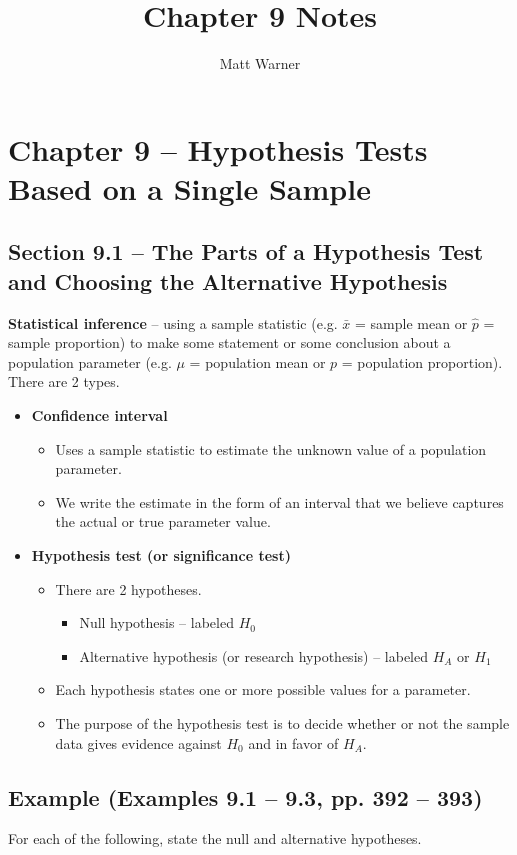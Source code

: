 \documentclass{report}
\title{\Huge{Chapter 9 Notes}}
\author{\huge{Matt Warner}}
\date{\huge{}}
\begin{document}
  \maketitle
\chapter*{Chapter 9 – Hypothesis Tests Based on a Single Sample}
\section*{Section 9.1 – The Parts of a Hypothesis Test and Choosing the Alternative Hypothesis}
\textbf{Statistical inference} – using a sample statistic (e.g. $\bar{x}$ = sample mean or $\hat{p}$ = sample proportion) to make some statement or some conclusion about a population parameter (e.g. $\mu$ = population mean or $p$ = population proportion). There are 2 types.
\begin{itemize}
  \item \textbf{Confidence interval}
    \begin{itemize}[label=$\circ$]
    \item Uses a sample statistic to estimate the unknown value of a population parameter.
    \item We write the estimate in the form of an interval that we believe captures the actual or true parameter value.
  \end{itemize}
  \item \textbf{Hypothesis test (or significance test)}
  \begin{itemize}
    \item There are 2 hypotheses.
    \begin{itemize}
      \item Null hypothesis – labeled $H_0$
      \item Alternative hypothesis (or research hypothesis) – labeled $H_A$ or $H_1$
    \end{itemize}
    \item Each hypothesis states one or more possible values for a parameter.
    \item The purpose of the hypothesis test is to decide whether or not the sample data gives evidence against $H_0$ and in favor of $H_A$.
  \end{itemize}
\end{itemize}
\section*{Example (Examples 9.1 – 9.3, pp. 392 – 393)}
For each of the following, state the null and alternative hypotheses.
\end{document}
